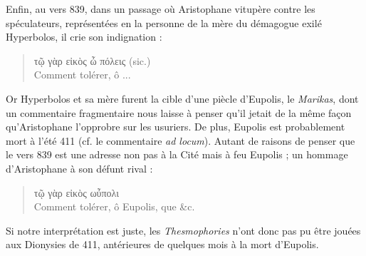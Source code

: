 \documentclass{book}%
\newcommand{\italique}[1]{\textit{#1}}%
\newcommand{\citComm}[1]{\begin{quote}#1\end{quote}}
\begin{document}
Enfin, au vers  839, dans un passage où Aristophane vitupère contre les spéculateurs, représentées en la personne de la mère du démagogue exilé Hyperbolos, il crie son indignation :%
\citComm{τῷ γὰρ εἰκὸς ὦ πόλεις (sic.)\\
Comment tolérer, ô ...}%

Or Hyperbolos et sa mère furent la cible d'une piècle d'Eupolis, le \italique{Marikas}, dont un commentaire fragmentaire nous laisse à penser qu'il jetait de la même façon qu'Aristophane l'opprobre sur les usuriers. De plus, Eupolis est probablement mort à l'été 411 (cf. le commentaire \italique{ad locum}). Autant de raisons de penser que le vers 839 est une adresse non pas à la Cité mais à feu Eupolis ; un hommage d'Aristophane à son défunt rival :%
\citComm{τῷ γὰρ εἰκὸς ωὖπολι\\
Comment tolérer, ô Eupolis, que \&c.}

Si notre interprétation est juste, les \italique{Thesmophories} n'ont donc pas pu être jouées aux Dionysies de 411, antérieures de quelques mois à la mort d'Eupolis.
\end{document}
